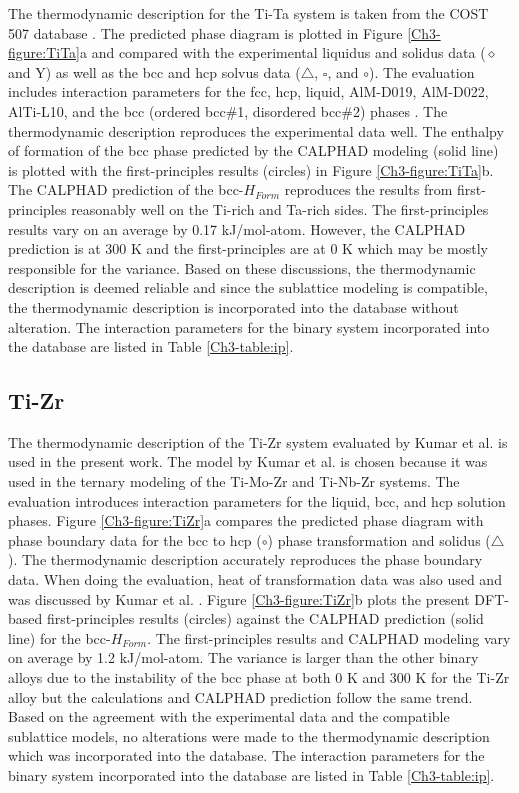 The thermodynamic description for the Ti-Ta system is taken from the COST 507 database \cite{Ansara1998}. The predicted phase diagram is plotted in Figure \ref{Ch3-figure:TiTa}a and compared with the experimental liquidus and solidus data ($\diamond$ and Y) as well as the bcc and hcp solvus data ($\bigtriangleup$, $\square$, and $\circ$). The evaluation includes interaction parameters for the fcc, hcp, liquid, AlM-D019, AlM-D022, AlTi-L10, and the bcc (ordered bcc\#1, disordered bcc\#2) phases \cite{Murray1987}. The thermodynamic description reproduces the experimental data well. The enthalpy of formation of the bcc phase predicted by the CALPHAD modeling (solid line) is plotted with the first-principles results (circles) in Figure \ref{Ch3-figure:TiTa}b. The CALPHAD prediction of the bcc-$H_{Form}$ reproduces the results from first-principles reasonably well on the Ti-rich and Ta-rich sides. The first-principles results vary on an average by 0.17 kJ/mol-atom. However, the CALPHAD prediction is at 300 K and the first-principles are at 0 K which may be mostly responsible for the variance. Based on these discussions, the thermodynamic description is deemed reliable and since the sublattice modeling is compatible, the thermodynamic description is incorporated into the database without alteration. The interaction parameters for the binary system incorporated into the database are listed in Table \ref{Ch3-table:ip}.

\subsection{Ti-Zr}

The thermodynamic description of the Ti-Zr system evaluated by Kumar et al. \cite{Kumar1994a} is used in the present work. The model by Kumar et al. \cite{Kumar1994a} is chosen because it was used in the ternary modeling of the Ti-Mo-Zr and Ti-Nb-Zr systems. The evaluation introduces interaction parameters for the liquid, bcc, and hcp solution phases. Figure \ref{Ch3-figure:TiZr}a compares the predicted phase diagram with phase boundary data for the bcc to hcp ($\circ$) phase transformation and solidus ($\bigtriangleup$). The thermodynamic description accurately reproduces the phase boundary data. When doing the evaluation, heat of transformation data was also used and was discussed by Kumar et al. \cite{Kumar1994a}. Figure \ref{Ch3-figure:TiZr}b plots the present DFT-based first-principles results (circles) against the CALPHAD prediction (solid line) for the bcc-$H_{Form}$. The first-principles results and CALPHAD modeling vary on average by 1.2 kJ/mol-atom. The variance is larger than the other binary alloys due to the instability of the bcc phase at both 0 K and 300 K for the Ti-Zr alloy but the calculations and CALPHAD prediction follow the same trend. Based on the agreement with the experimental data and the compatible sublattice models, no alterations were made to the thermodynamic description which was incorporated into the database. The interaction parameters for the binary system incorporated into the database are listed in Table \ref{Ch3-table:ip}. 

